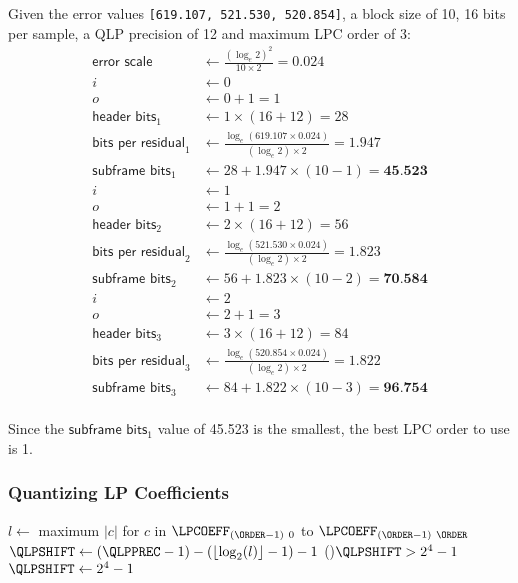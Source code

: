 Given the error values \texttt{[619.107, 521.530, 520.854]},
a block size of 10, 16 bits per sample, a QLP precision of 12 and maximum LPC order of 3:
\begin{align*}
  \textsf{error scale} &\leftarrow \frac{({\log_e 2}) ^ 2}{10 \times 2} = 0.024 \\
  i &\leftarrow 0 \\
  o &\leftarrow 0 + 1 = 1 \\
  \textsf{header bits}_1 &\leftarrow 1 \times (16 + 12) = 28 \\
  \textsf{bits per residual}_1 &\leftarrow \frac{\log_e(619.107 \times 0.024)}{({\log_e 2}) \times 2} = 1.947 \\
  \textsf{subframe bits}_1 &\leftarrow 28 + 1.947 \times (10 - 1) = \textbf{45.523} \\
  i &\leftarrow 1 \\
  o &\leftarrow 1 + 1 = 2 \\
  \textsf{header bits}_2 &\leftarrow 2 \times (16 + 12) = 56 \\
  \textsf{bits per residual}_2 &\leftarrow \frac{\log_e(521.530 \times 0.024)}{({\log_e 2}) \times 2} = 1.823 \\
  \textsf{subframe bits}_2 &\leftarrow 56 + 1.823 \times (10 - 2) = \textbf{70.584} \\
  i &\leftarrow 2 \\
  o &\leftarrow 2 + 1 = 3 \\
  \textsf{header bits}_3 &\leftarrow 3 \times (16 + 12) = 84 \\
  \textsf{bits per residual}_3 &\leftarrow \frac{\log_e(520.854 \times 0.024)}{({\log_e 2}) \times 2} = 1.822 \\
  \textsf{subframe bits}_3 &\leftarrow 84 + 1.822 \times (10 - 3) = \textbf{96.754} \\
\end{align*}
\par
\noindent
Since the $\textsf{subframe bits}_1$ value of 45.523 is the smallest,
the best LPC order to use is 1.

\clearpage

\subsubsection{Quantizing LP Coefficients}
\label{flac:quantize_lp_coeffs}
$l \leftarrow $ maximum $|c|$ for $c$ in $\text{\LPCOEFF}_{(\ORDER - 1)~0}$ to $\text{\LPCOEFF}_{(\ORDER - 1)~\ORDER}$\;
$\QLPSHIFT \leftarrow (\text{\QLPPREC} - 1) - (\lfloor \log_2(l) \rfloor - 1) - 1$\;
\uIf(){$\QLPSHIFT > 2 ^ 4 - 1$}{
  $\QLPSHIFT \leftarrow 2 ^ 4 - 1$\;
}

